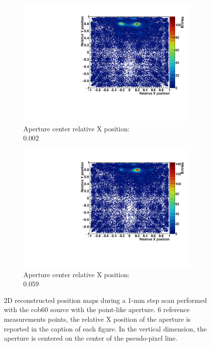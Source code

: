 \begin{figure}
\begin{subfigure}[t]{0.32\textwidth}
\centering
\includegraphics[width=\textwidth]{03_GraphicFiles/chapter3_CLaRySproto/Absorber/images_scan/point_1mm/run00267_floodMap.pdf}
\caption{Aperture center relative X position: \\ 0.002}
\label{chap3::fig::scan_map5_1mm_point}
\end{subfigure}
\begin{subfigure}[t]{0.32\textwidth}
\centering
\includegraphics[width=\textwidth]{03_GraphicFiles/chapter3_CLaRySproto/Absorber/images_scan/point_1mm/run00268_floodMap.pdf}
\caption{Aperture center relative X position: \\ 0.059}
\label{chap3::fig::scan_map6_1mm_point}
\end{subfigure}
\caption{2D reconstructed position maps during a 1-mm step scan performed with the \gls{cob60} source with the point-like aperture. 6 reference measurements points, the relative X position of the aperture is reported in the caption of each figure. In the vertical dimension, the aperture is centered on the center of the pseudo-pixel line.}
\label{chap3::fig::ScanFloodMap_1mm_point}
\end{figure}

